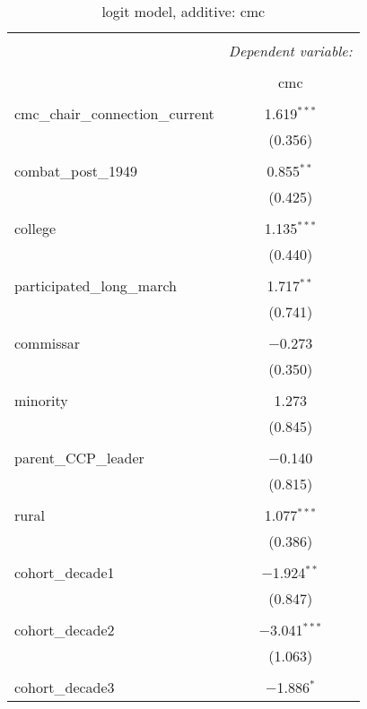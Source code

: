 \documentclass[12pt,letterpaper]{article}
\begin{document}
\begin{table}[!htbp] \centering 
	\caption{logit model, additive: cmc} 
	\label{} 
	\rmfamily
	\scriptsize
	\begin{tabular}{@{\extracolsep{5pt}}lc} 
		\\[-1.8ex]\hline 
		\hline \\[-1.8ex] 
		& \multicolumn{1}{c}{\textit{Dependent variable:}} \\ 
		\cline{2-2} 
		\\[-1.8ex] & cmc \\ 
		\hline \\[-1.8ex] 
		cmc\_chair\_connection\_current & 1.619$^{***}$ \\ 
		& (0.356) \\ 
		& \\ 
		combat\_post\_1949 & 0.855$^{**}$ \\ 
		& (0.425) \\ 
		& \\ 
		college & 1.135$^{***}$ \\ 
		& (0.440) \\ 
		& \\ 
		participated\_long\_march & 1.717$^{**}$ \\ 
		& (0.741) \\ 
		& \\ 
		commissar & $-$0.273 \\ 
		& (0.350) \\ 
		& \\ 
		minority & 1.273 \\ 
		& (0.845) \\ 
		& \\ 
		parent\_CCP\_leader & $-$0.140 \\ 
		& (0.815) \\ 
		& \\ 
		rural & 1.077$^{***}$ \\ 
		& (0.386) \\ 
		& \\ 
		cohort\_decade1 & $-$1.924$^{**}$ \\ 
		& (0.847) \\ 
		& \\ 
		cohort\_decade2 & $-$3.041$^{***}$ \\ 
		& (1.063) \\ 
		& \\ 
		cohort\_decade3 & $-$1.886$^{*}$ \\ 

\end{tabular}
\end{table}
\end{document}

